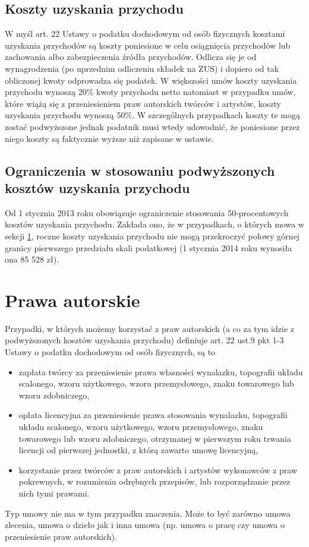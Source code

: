 \subsection[Koszty uzyskania przychodu][Koszty uzyskania przychodu]{Koszty uzyskania przychodu}
W myśl art. 22 Ustawy o podatku dochodowym od osób fizycznych\cite{ustawaOPodatkuDochodowym} kosztami uzyskania przychodów są koszty poniesione w celu osiągnięcia przychodów lub zachowania albo zabezpieczenia źródła przychodów. Odlicza się je od wynagrodzenia (po uprzednim odliczeniu składek na ZUS) i dopiero od tak obliczonej kwoty odprowadza się podatek. W większości umów koszty uzyskania przychodu wynoszą 20\% kwoty przychodu netto natomiast w przypadku umów, które wiążą się z przeniesieniem praw autorskich twórców i artystów, koszty uzyskania przychodu wynoszą 50\%. W szczególnych przypadkach koszty te mogą zostać podwyższone jednak podatnik musi wtedy udowodnić, że poniesione przez niego koszty są faktycznie wyższe niż zapisane w ustawie.

\subsection[Ograniczenia w stosowaniu podwyższonych kosztów uzyskania przychodu][Ograniczenia w stosowaniu podwyższonych kosztów uzyskania przychodu]{Ograniczenia w stosowaniu podwyższonych kosztów uzyskania przychodu}
Od 1 stycznia 2013 roku obowiązuje ograniczenie stosowania 50-procentowych kosztów uzyskania przychodu. Zakłada ono, że  w przypadkach, o których mowa w sekcji \ref{prawaAutorskie}, roczne koszty uzyskania przychodu nie mogą przekroczyć połowy górnej granicy pierwszego przedziału skali podatkowej (1 stycznia 2014 roku wynosiła ona 85 528 zł).

\section[Prawa autorskie][Prawa autorskie]{Prawa autorskie}
\label{prawaAutorskie}
Przypadki, w których możemy korzystać z praw autorskich (a co za tym idzie z podwyższonych kosztów uzyskania przychodu) definiuje art. 22 ust.9 pkt 1-3 Ustawy o podatku dochodowym od osób fizycznych\cite{ustawaOPodatkuDochodowym}, są to
\begin{itemize}
	\item  zapłata twórcy za przeniesienie prawa własności wynalazku, topografii układu scalonego, wzoru użytkowego, wzoru przemysłowego, znaku towarowego lub wzoru zdobniczego,
	\item opłata licencyjna za przeniesienie prawa stosowania wynalazku, topografii układu scalonego, wzoru użytkowego, wzoru przemysłowego, znaku towarowego lub wzoru zdobniczego, otrzymanej w pierwszym roku trwania licencji od pierwszej jednostki, z którą zawarto umowę licencyjną,
	\item korzystanie przez twórców z praw autorskich i artystów wykonawców z praw pokrewnych, w rozumieniu odrębnych przepisów, lub rozporządzanie przez nich tymi prawami.
\end{itemize}
Typ umowy nie ma w tym przypadku znaczenia. Może to być zarówno umowa zlecenia, umowa o dzieło jak i inna umowa (np. umowa o pracę czy umowa o przeniesienie praw autorskich).

